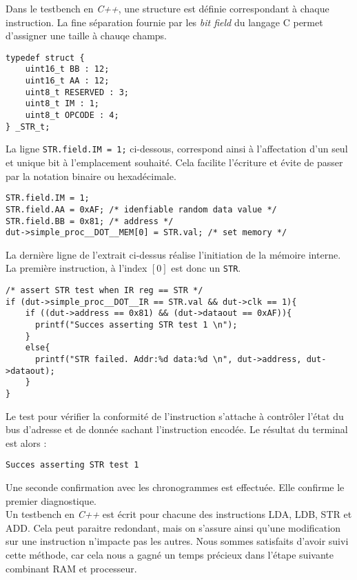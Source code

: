 Dans le testbench en \textit{C++}, une structure est définie correspondant à chaque instruction.
La fine séparation fournie par les \textit{bit field} du langage C permet d'assigner une taille à chauqe champs.
\begin{lstlisting}[style=CStyle]
typedef struct {
    uint16_t BB : 12;
    uint16_t AA : 12;
    uint8_t RESERVED : 3;
    uint8_t IM : 1;
    uint8_t OPCODE : 4;
} _STR_t;
\end{lstlisting}
La ligne \texttt{STR.field.IM = 1;} ci-dessous, correspond ainsi à l'affectation d'un seul et unique bit à l'emplacement souhaité.
Cela facilite l'écriture et évite de passer par la notation binaire ou hexadécimale.
\begin{lstlisting}[style=CStyle]
STR.field.IM = 1;
STR.field.AA = 0xAF; /* idenfiable random data value */
STR.field.BB = 0x81; /* address */
dut->simple_proc__DOT__MEM[0] = STR.val; /* set memory */
\end{lstlisting}
La dernière ligne de l'extrait ci-dessus réalise l'initiation de la mémoire interne.
La première instruction, à l'index $[0]$ est donc un \texttt{STR}.
\begin{lstlisting}[style=CStyle]
/* assert STR test when IR reg == STR */
if (dut->simple_proc__DOT__IR == STR.val && dut->clk == 1){ 
    if ((dut->address == 0x81) && (dut->dataout == 0xAF)){
      printf("Succes asserting STR test 1 \n");
    }
    else{
      printf("STR failed. Addr:%d data:%d \n", dut->address, dut->dataout);
    }
}
\end{lstlisting}
Le test pour vérifier la conformité de l'instruction s'attache à contrôler l'état du bus d'adresse et de donnée sachant l'instruction encodée.
Le résultat du terminal est alors :
\begin{lstlisting}[frame=single, basicstyle = \ttfamily \footnotesize]
    Succes asserting STR test 1
\end{lstlisting}
Une seconde confirmation avec les chronogrammes est effectuée.
Elle confirme le premier diagnostique.\\

Un testbench en \textit{C++} est écrit pour chacune des instructions LDA, LDB, STR et ADD.
Cela peut paraitre redondant, mais on s'assure ainsi qu'une modification sur une instruction n'impacte pas les autres.
Nous sommes satisfaits d'avoir suivi cette méthode, car cela nous a gagné un temps précieux dans l'étape suivante combinant RAM et processeur.


